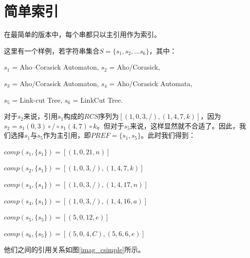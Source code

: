 ﻿\documentclass{sysuthesis}
\begin{document}
\section{简单索引}
在最简单的版本中，每个串都只以主引用作为索引。\par
这里有一个样例，若字符串集合$S = \{s_{1}, s_{2}, ... s_{6}\}$，其中：\par
\hspace{1cm}$s_{1}$ = Aho–Corasick Automaton, $s_{2}$ = Aho/Corasick,\par
\hspace{1cm}$s_{3}$ = Aho/Corasick Automaton, $s_{4}$ = Aho/Corasick Automata,\par
\hspace{1cm}$s_{5}$ = Link-cut Tree, $s_{6}$ = LinkCut Tree.\par
对于$s_{2}$来说，引用$s_{1}$构成的$RCS$序列为$[(1, 0, 3, /), (1, 4, 7, k)]$，因为$s_{2} = s_{1}(0, 3) \circ / \circ s_{1}(4, 7) \circ k$。但对于$s_{5}$来说，这样显然就不合适了。因此，我们选择$s_{1}$与$s_{5}$作为主引用，即$PREF = \{s_{1}, s_{5}\}$。此时我们得到：\par
\hspace{1cm}$comp(s_{1}, \{s_{1}\}) = [(1, 0, 21, n)]$\par
\hspace{1cm}$comp(s_{2}, \{s_{1}\}) = [(1, 0, 3, /), (1, 4, 7, k)]$\par
\hspace{1cm}$comp(s_{3}, \{s_{1}\}) = [(1, 0, 3, /), (1, 4, 17, n)]$\par
\hspace{1cm}$comp(s_{4}, \{s_{1}\}) = [(1, 0, 3, /), (1, 4, 16, a)]$\par
\hspace{1cm}$comp(s_{5}, \{s_{5}\}) = [(5, 0, 12, e)]$\par
\hspace{1cm}$comp(s_{6}, \{s_{5}\}) = [(5, 0, 4, C), (5, 6, 6, e)]$\par
他们之间的引用关系如图\ref{imag_csimple}所示。\par
\end{document}
